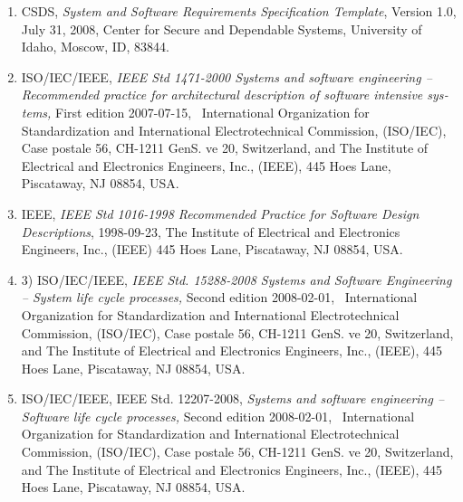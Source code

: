 \documentclass[twoside,letterpaper]{article}
\newcommand\liststyleWWviiiNumii{%
\renewcommand\theenumi{\arabic{enumi}}
\renewcommand\theenumii{\arabic{enumii}}
\renewcommand\theenumiii{\arabic{enumiii}}
\renewcommand\theenumiv{\arabic{enumiv}}
\renewcommand\labelenumi{\theenumi)}
\renewcommand\labelenumii{\theenumii.}
\renewcommand\labelenumiii{\theenumiii.}
\renewcommand\labelenumiv{\theenumiv.}
}
\begin{document}
\liststyleWWviiiNumii
\begin{enumerate}
\item {\color{black}
\foreignlanguage{english}{CSDS,
}\foreignlanguage{english}{\textit{System and Software Requirements
Specification Template}}\foreignlanguage{english}{, Version 1.0, July
31, 2008, Center for Secure and Dependable Systems, University of
Idaho, Moscow, ID, 83844.}}
\item {\color{black}
\foreignlanguage{english}{ISO/IEC/IEEE,
}\foreignlanguage{english}{\textit{IEEE Std 1471-2000 Systems and
software engineering -- Recommended practice for architectural
description of software intensive systems,}}\foreignlanguage{english}{
First edition 2007-07-15, \ International Organization for
Standardization and International Electrotechnical Commission,
(ISO/IEC), Case postale 56, CH-1211 GenS. ve 20, Switzerland, and The
Institute of Electrical and Electronics Engineers, Inc., (IEEE), 445
Hoes Lane, Piscataway, NJ 08854, USA.}}
\item {\color{black}
\foreignlanguage{english}{IEEE, }\foreignlanguage{english}{\textit{IEEE
Std 1016-1998 Recommended Practice for Software Design
Descriptions}}\foreignlanguage{english}{, 1998-09-23, The Institute of
Electrical and Electronics Engineers, Inc., (IEEE) 445 Hoes Lane,
Piscataway, NJ 08854, USA.}}
\item {\color{black}
\foreignlanguage{english}{3) ISO/IEC/IEEE,
}\foreignlanguage{english}{\textit{IEEE Std. 15288-2008 Systems and
Software Engineering -- System life cycle
processes,}}\foreignlanguage{english}{ Second edition 2008-02-01,
\ International Organization for Standardization and International
Electrotechnical Commission, (ISO/IEC), Case postale 56, CH-1211 GenS. ve
20, Switzerland, and The Institute of Electrical and Electronics
Engineers, Inc., (IEEE), 445 Hoes Lane, Piscataway, NJ 08854, USA.}}
\item {\color{black}
\foreignlanguage{english}{ISO/IEC/IEEE, IEEE Std. 12207-2008,
}\foreignlanguage{english}{\textit{Systems and software engineering --
Software life cycle processes, }}\foreignlanguage{english}{Second
edition 2008-02-01, \ International Organization for Standardization
and International Electrotechnical Commission, (ISO/IEC), Case postale
56, CH-1211 }\foreignlanguage{english}{GenS. ve 20, Switzerland, and The
Institute of Electrical and Electronics Engineers, Inc., (IEEE), 445
Hoes Lane, Piscataway, NJ 08854, USA.}}
\end{enumerate}
\end{document}

